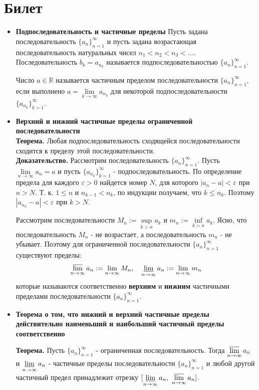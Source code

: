 \documentclass[12pt,a4paper]{article}
\begin{document}
\section{Билет}
\begin{itemize}

\item \textbf{ Подпоследовательность и частичные пределы}
Пусть задана последовательность $\{a_n\}_{n=1}^\infty$ и пусть задана возрастающая последовательность натуральных чисел $n_1 < n_2 < n_3 < \ldots$. Последовательность $b_k = a_{n_k}$ называется подпоследовательностью $\{a_n\}_{n=1}^\infty$.

Число $a \in \mathbb{R}$ называется частичным пределом последовательности $\{a_n\}_{n=1}^\infty$, если выполнено $a = \lim\limits_{k \to \infty}{a_{n_k}}$ для некоторой подпоследовательности $\{a_{n_k}\}_{k=1}^\infty$.

\item \textbf{Верхний и нижний частичные пределы ограниченной последовательности} \\
\textbf{Теорема.} Любая подпоследовательность сходящейся последовательности сходится к пределу этой последовательности. \\
\textbf{Доказательство.}
Рассмотрим последовательность $\{a_n\}_{n=1}^\infty$. Пусть $\lim\limits_{n \to \infty}{a_n} = a$ и пусть $\{a_{n_k}\}_{k=1}^\infty$ - подпоследовательность. По определение предела для каждого $\varepsilon > 0$ найдется номер $N$, для которого $|a_n - a| < \varepsilon$ при $n > N$. Т. к. $1 \leq n$ и $n_{k-1} < n_k$, по индукции получаем, что $k \leq n_k$. Поэтому $|a_{n_k} - a| < \varepsilon$ при $k > N$.

Рассмотрим последовательности $M_n := \sup\limits_{k>n}{a_k}$ и $m_n := \inf\limits_{k>n}{a_k}$. Ясно, что последовательность $M_n$ - не возрастает, а последовательность $m_n$ - не убывает. Поэтому для ограниченной последовательности $\{a_n\}_{n=1}^\infty$ существуют пределы:
\[
    \varlimsup_{n \to \infty}{a_n} := \lim_{n \to \infty}{M_n} 
    ,\ \ \
    \varliminf_{n \to \infty}{a_n} :=  \lim_{n \to \infty}{m_n} 
\]
которые называются соответственно \textbf{верхним} и \textbf{нижним} частичными пределами последовательности $\{a_n\}_{n=1}^\infty$.

\item\textbf{ Теорема о том, что нижний и верхний частичные пределы действительно наименьший и наибольший частичный пределы соответственно}

\textbf{Теорема.} 
Пусть $\{a_n\}_{n=1}^\infty$ - ограниченная последовательность. Тогда $\varlimsup\limits_{n \to \infty}{a_n}$ и $\varliminf\limits_{n \to \infty}{a_n}$  - частичные пределы последовательности $\{a_n\}_{n=1}^\infty$ и любой другой частичный предел принадлежит отрезку $[\varliminf\limits_{n \to \infty}{a_n},\ \varlimsup\limits_{n \to \infty}{a_n}]$.


\end{itemize}
\end{document}
